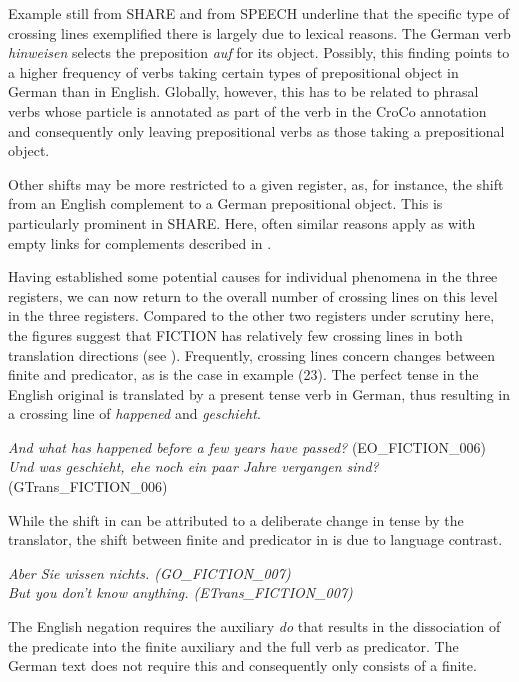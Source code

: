 \documentclass[output=paper]{LSP/langsci}
\begin{document}
Example  still from SHARE and  from SPEECH underline that the specific type of crossing lines exemplified there is largely due to lexical reasons. The German verb \textit{hinweisen} selects the preposition \textit{auf} for its object. Possibly, this finding points to a higher frequency of verbs taking certain types of prepositional object in German than in English. Globally, however, this has to be related to phrasal verbs whose particle is annotated as part of the verb in the CroCo annotation and consequently only leaving prepositional verbs as those taking a prepositional object. 

Other shifts may be more restricted to a given register, as, for instance, the shift from an English complement to a German prepositional object. This is particularly prominent in SHARE. Here, often similar reasons apply as with empty links for complements described in .

Having established some potential causes for individual phenomena in the three registers, we can now return to the overall number of crossing lines on this level in the three registers. Compared to the other two registers under scrutiny here, the figures suggest that FICTION has relatively few crossing lines in both translation directions (see ). Frequently, crossing lines concern changes between finite and predicator, as is the case in example (23). The perfect tense in the English original is translated by a present tense verb in German, thus resulting in a crossing line of \textit{happened} and \textit{geschieht}. 

\ea \label{ex:culo:23}
    \ea \textit{And what has happened before a few years have passed?} (EO\_FICTION\_006)\\
     \ex \textit{Und was geschieht, ehe noch ein paar Jahre vergangen sind?} (GTrans\_FICTION\_006) 
     \z
\z
 
 
While the shift in  can be attributed to a deliberate change in tense by the translator, the shift between finite and predicator in  is due to language contrast.

\ea\label{ex:culo:24}
  \ea 
\textit{Aber Sie wissen nichts. \textup{(GO\_FICTION\_007)}}\\
  \ex 
\textit{But you don't know anything. \textup{(ETrans\_FICTION\_007)}}
  \z
\z 


The English negation requires the auxiliary \textit{do} that results in the dissociation of the predicate into the finite auxiliary and the full verb as predicator. The German text does not require this and consequently only consists of a finite. 
\end{document}
